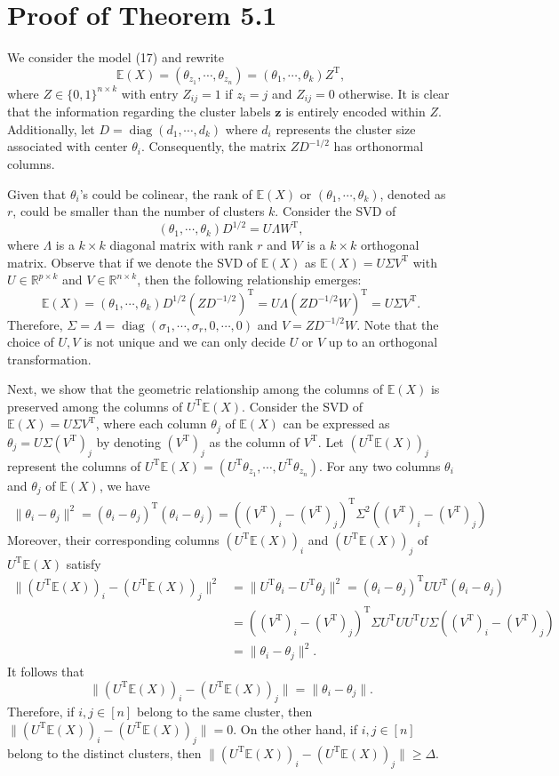 \documentclass[reqno]{amsart}
\DeclareMathOperator{\diag}{diag}
\newcommand{\E}{\mathbb{E}}
\newcommand{\T}{\mathrm{T}}
\theoremstyle{plain}
\theoremstyle{definition}
\begin{document}
\section{Proof of Theorem 5.1}\label{sec:app:gmm}

We consider the model (17) and rewrite
$$\E(X) = (\theta_{z_1},\cdots,\theta_{z_n}) = (\theta_{1},\cdots,\theta_{k}) Z^\T,$$
where $Z \in \{0,1\}^{n\times k}$ with entry $Z_{ij}=1$ if $z_i = j$ and $Z_{ij}=0$ otherwise. It is clear that the information regarding the cluster labels $\mathbf z$ is entirely encoded within $Z$. Additionally, let $D=\diag(d_1,\cdots,d_k)$ where $d_i$ represents the cluster size associated with center $\theta_i$. Consequently, the matrix $Z D^{-1/2}$ has orthonormal columns. 

Given that $\theta_i$'s could be colinear, the rank of $\E(X)$ or $(\theta_{1},\cdots,\theta_{k})$, denoted as $r$, could be smaller than the number of clusters $k$. Consider the SVD of $$(\theta_{1},\cdots,\theta_{k}) D^{1/2} = U \Lambda {W}^\T,$$ where $\Lambda$ is a $k\times k$ diagonal matrix with rank $r$ and ${W}$ is a $k\times k$ orthogonal matrix. Observe that if we denote the SVD of $\E(X)$ as $\E(X)=U \Sigma V^\T$ with $U \in \mathbb R^{p\times k}$ and $V \in \mathbb R^{n\times k}$, then the following relationship emerges:
$$\E (X)  =(\theta_{1},\cdots,\theta_{k}) D^{1/2} (ZD^{-1/2})^\T= U \Lambda (Z D^{-1/2}  W)^\T= U \Sigma V^\T.$$
Therefore, $\Sigma = \Lambda=\diag(\sigma_1,\cdots,\sigma_r,0,\cdots,0)$ and 
$V= Z D^{-1/2} W$. Note that the choice of $U,V$ is not unique and we can only decide $U$ or $V$ up to an orthogonal transformation. 

Next, we show that the geometric relationship among the columns of $\E(X)$ is preserved among the columns of $U^\T \E(X)$. Consider the SVD of $\E(X)=U \Sigma V^\T$, where each column $\theta_j$ of $\E(X)$ can be expressed as $\theta_j =U \Sigma (V^\T)_j $ by denoting $(V^\T)_j$ as the column of $V^\T$. Let $(U^\T \E (X))_j$ represent the columns of $U^\T \E (X) = (U^\T \theta_{z_1},\cdots,U^\T \theta_{z_n}) $. For any two columns $\theta_i$ and $\theta_j$ of $\E(X)$, we have
\begin{align*}
\|\theta_i- \theta_j\|^2=(\theta_i- \theta_j)^\T (\theta_i- \theta_j)= \left((V^\T)_i- (V^\T)_j\right)^\T \Sigma^2 \left((V^\T)_i- (V^\T)_j\right) 
\end{align*}
Moreover, their corresponding columns $(U^\T \E (X))_i$ and $(U^\T \E (X))_j$ of $U^\T \E (X)$  satisfy
\begin{align*}
\|(U^\T \E (X))_i- (U^\T \E (X))_j\|^2 &= \| U^\T \theta_i - U^\T \theta_j \|^2 = (\theta_i- \theta_j)^\T  U U^\T(\theta_i- \theta_j)\\
&=\left((V^\T)_i- (V^\T)_j\right)^\T \Sigma U^\T  U U^\T  U\Sigma \left((V^\T)_i- (V^\T)_j\right) \\
&=\|\theta_i- \theta_j\|^2.
\end{align*}
It follows that $$\|(U^\T \E (X))_i- (U^\T \E (X))_j\| = \|\theta_i- \theta_j\|.$$ Therefore, if $i, j \in [n]$ belong to the same cluster, then $\|(U^\T \E (X))_i- (U^\T \E (X))_j\|=0$. On the other hand, if $i, j \in [n]$ belong to the distinct clusters, then $\|(U^\T \E (X))_i- (U^\T \E (X))_j\|\ge \Delta.$
\end{document}
